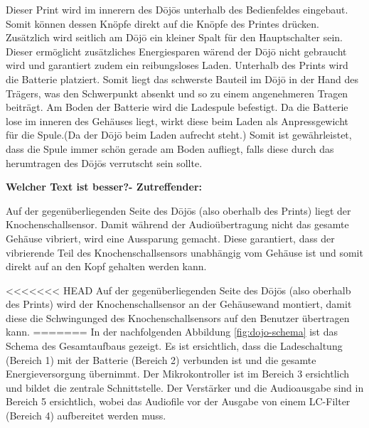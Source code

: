 Dieser Print wird im innerern des Dōjōs unterhalb des Bedienfeldes eingebaut. Somit können dessen Knöpfe direkt auf die Knöpfe des Printes drücken. Zusätzlich wird seitlich am Dōjō ein kleiner Spalt für den Hauptschalter sein. Dieser ermöglicht zusätzliches Energiesparen wärend der Dōjō nicht gebraucht wird und garantiert zudem ein reibungsloses Laden. Unterhalb des Prints wird die Batterie platziert. Somit liegt das schwerste Bauteil im Dōjō in der Hand des Trägers, was den Schwerpunkt absenkt und so zu einem angenehmeren Tragen beiträgt. Am Boden der Batterie wird die Ladespule befestigt. Da die Batterie lose im inneren des Gehäuses liegt, wirkt diese beim Laden als Anpressgewicht für die Spule.(Da der Dōjō beim Laden aufrecht steht.) Somit ist gewährleistet, dass die Spule immer schön gerade am Boden aufliegt, falls diese durch das herumtragen des Dōjōs verrutscht sein sollte. 
 
\textbf{Welcher Text ist besser?- Zutreffender:}
 
Auf der gegenüberliegenden Seite des Dōjōs (also oberhalb des Prints) liegt der Knochenschallsensor. Damit während der Audioübertragung nicht das gesamte Gehäuse vibriert, wird eine Aussparung gemacht. Diese garantiert, dass der vibrierende Teil des Knochenschallsensors unabhängig vom Gehäuse ist und somit direkt auf an den Kopf gehalten werden kann.
 
<<<<<<< HEAD
Auf der gegenüberliegenden Seite des Dōjōs (also oberhalb des Prints) wird der Knochenschallsensor an der Gehäusewand montiert, damit diese die Schwingunged des Knochenschallsensors auf den Benutzer übertragen kann.
=======
In der nachfolgenden Abbildung \ref{fig:dojo-schema} ist das Schema des Gesamtaufbaus gezeigt. Es ist ersichtlich, dass die Ladeschaltung (Bereich 1) mit der Batterie (Bereich 2) verbunden ist und die gesamte Energieversorgung übernimmt. Der Mikrokontroller ist im Bereich 3 ersichtlich und bildet die zentrale Schnittstelle. Der Verstärker und die Audioausgabe sind in Bereich 5 ersichtlich, wobei das Audiofile vor der Ausgabe von einem LC-Filter (Bereich 4) aufbereitet werden muss.
\newpage 


